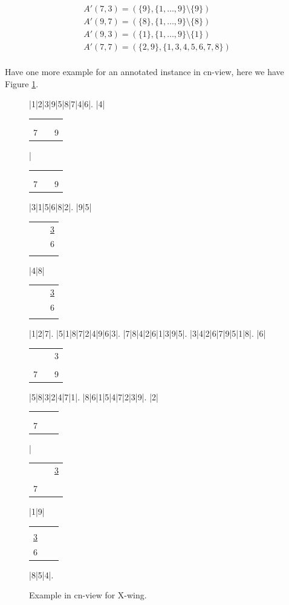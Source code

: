 \documentclass[11pt]{report}
\newcommand{\cell}[9]{%
\scriptsize
\setlength{\tabcolsep}{1pt}
\renewcommand{\arraystretch}{0.5}
\hspace{-0.6em}
\begin{tabular}{ccc}
#1 & #2 & #3\\
#4 & #5 & #6\\
#7 & #8 & #9
\end{tabular}
}
\newcommand{\set}[1]{\{ #1 \}}
\begin{document}
\begin{eqnarray*}
A'(7,3) = (\set{9}, \set{1, \dots, 9} \setminus \set{9})\\
A'(9,7) = (\set{8}, \set{1, \dots, 9} \setminus \set{8})\\
A'(9,3) = (\set{1}, \set{1, \dots, 9} \setminus \set{1})\\
A'(7,7) = (\set{2, 9}, \set{1, 3, 4, 5, 6, 7, 8})\\
\end{eqnarray*}

Have one more example for an annotated instance in cn-view, here we have Figure \ref{fig:xwingcn}.

\begin{figure}
\begin{sudoku}
|{1}|{2}|{3}|{9}|{5}|{8}|{7}|{4}|{6}|.
|{4}|{\cell {}{}{}{}{}{}7{}9}|{\cell {}{}{}{}{}{}7{}9}|3|1|5|6|8|2|.
|{9}|5|{\cell {}{}{\underline 3}{}{}6{}{}{}}|4|8|{\cell {}{}{\underline 3}{}{}6{}{}{}}|1|2|7|.
|{5}|1|8|7|2|4|9|6|3|.
|{7}|8|4|2|6|1|3|9|5|.
|{3}|4|2|6|7|9|5|1|8|.
|{6}|{\cell {}{}3{}{}{}7{}9}|5|8|3|2|4|7|1|.
|{8}|6|1|5|4|7|2|3|9|.
|{2}|{\cell {}{}{\xout 3}{}{}{}7{}{}}|{\cell {}{}{\underline 3}{}{}{}7{}{}}|1|9|{\cell {}{}{}{\underline 3}{}{}6{}{}{}}|8|5|4|.
\end{sudoku}
\caption{Example in cn-view for X-wing.}
\label{fig:xwingcn}
\end{figure}
\end{document}
